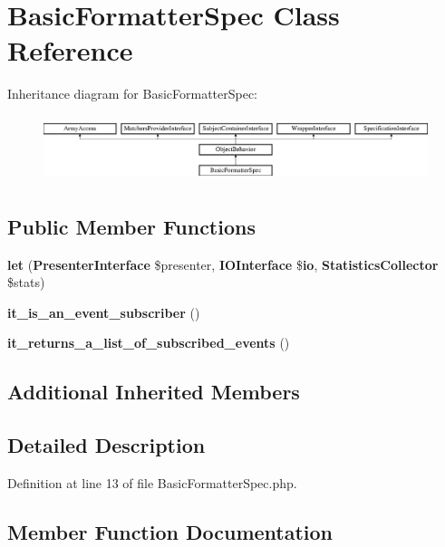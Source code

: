 \section{Basic\+Formatter\+Spec Class Reference}
\label{classspec_1_1_php_spec_1_1_formatter_1_1_basic_formatter_spec}
Inheritance diagram for Basic\+Formatter\+Spec\+:\begin{figure}[H]
\begin{center}
\leavevmode
\includegraphics[height=1.953488cm]{classspec_1_1_php_spec_1_1_formatter_1_1_basic_formatter_spec}
\end{center}
\end{figure}
\subsection*{Public Member Functions}
\begin{DoxyCompactItemize}
\item 
{\bf let} ({\bf Presenter\+Interface} \$presenter, {\bf I\+O\+Interface} \${\bf io}, {\bf Statistics\+Collector} \$stats)
\item 
{\bf it\+\_\+is\+\_\+an\+\_\+event\+\_\+subscriber} ()
\item 
{\bf it\+\_\+returns\+\_\+a\+\_\+list\+\_\+of\+\_\+subscribed\+\_\+events} ()
\end{DoxyCompactItemize}
\subsection*{Additional Inherited Members}


\subsection{Detailed Description}


Definition at line 13 of file Basic\+Formatter\+Spec.\+php.



\subsection{Member Function Documentation}
